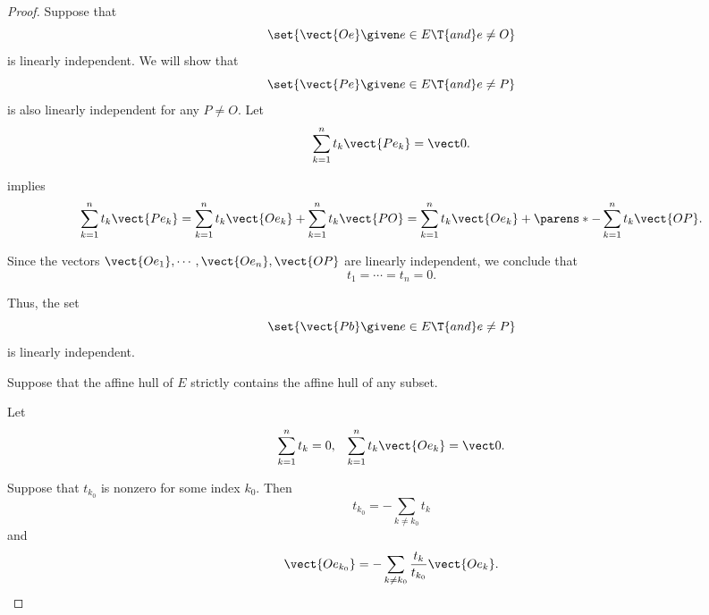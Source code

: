 \begin{proof}
   Suppose that
  \begin{equation*}
    \set{ \vect{O e} \given e \in E \T{and} e \neq O }
  \end{equation*}
  is linearly independent. We will show that
  \begin{equation*}
    \set{ \vect{P e} \given e \in E \T{and} e \neq P }
  \end{equation*}
  is also linearly independent for any \( P \neq O \). Let
  \begin{equation*}
    \sum_{k=1}^n t_k \vect{P e_k} = \vect 0.
  \end{equation*}

   implies
  \begin{equation*}
    \sum_{k=1}^n t_k \vect{P e_k}
    =
    \sum_{k=1}^n t_k \vect{O e_k} + \sum_{k=1}^n t_k \vect{P O}
    =
    \sum_{k=1}^n t_k \vect{O e_k} + \parens*{ -\sum_{k=1}^n t_k } \vect{O P}.
  \end{equation*}

  Since the vectors \( \vect{O e_1}, \cdots, \vect{O e_n}, \vect{O P} \) are linearly independent, we conclude that
  \begin{equation*}
    t_1 = \cdots = t_n = 0.
  \end{equation*}

  Thus, the set
  \begin{equation*}
    \set{ \vect{P b} \given e \in E \T{and} e \neq P }
  \end{equation*}
  is linearly independent.

   Suppose that the affine hull of \( E \) strictly contains the affine hull of any subset.

  Let
  \begin{align*}
    \sum_{k=1}^n t_k = 0,
    &&
    \sum_{k=1}^n t_k \vect{O e_k} = \vect 0.
  \end{align*}

  Suppose that \( t_{k_0} \) is nonzero for some index \( k_0 \). Then
  \begin{equation*}
    t_{k_0} = - \sum_{k \neq k_0} t_k
  \end{equation*}
  and
  \begin{equation*}
    \vect{O e_{k_0}} = -\sum_{k \neq k_0} \frac {t_k} {t_{k_0}} \vect{O e_k}.
  \end{equation*}


\end{proof}
